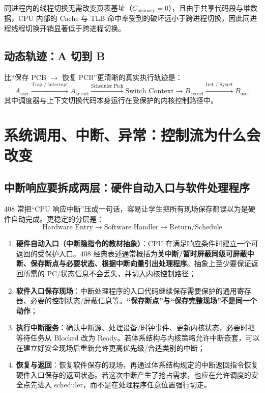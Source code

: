 \documentclass[11pt,a4paper]{ctexart}
\newcommand{\kw}[1]{\textbf{#1}}
\begin{document}
\begin{exam}[408 核心考点定性]
同进程内的线程切换无需改变页表基址（$C_{\text{memory}} = 0$），且由于共享代码段与堆数据，CPU 内部的 Cache 与 TLB 命中率受到的破坏远小于跨进程切换，因此同进程线程切换开销显著低于跨进程切换。
\end{exam}

\subsection{动态轨迹：A 切到 B}

比“保存 PCB $\to$ 恢复 PCB”更清晰的真实执行轨迹是：
\[
A_{\text{user}} \xrightarrow{\text{Trap / Interrupt}} A_{\text{kernel}} \xrightarrow{\text{Scheduler Pick}} \text{Switch Context} \xrightarrow{} B_{\text{kernel}} \xrightarrow{\text{Iret / Sysret}} B_{\text{user}}
\]
其中调度器与上下文切换代码本身运行在受保护的内核控制路径中。

\section{系统调用、中断、异常：控制流为什么会改变}

\subsection{中断响应要拆成两层：硬件自动入口与软件处理程序}

408 常把“CPU 响应中断”压成一句话，容易让学生把所有现场保存都误以为是硬件自动完成。更稳定的分层是：
\[
\boxed{\text{Hardware Entry}\rightarrow\text{Software Handler}\rightarrow\text{Return/Schedule}}
\]

\begin{enumerate}
\item \kw{硬件自动入口（中断隐指令的教材抽象）}：CPU 在满足响应条件时建立一个可返回的受保护入口。408 经典表述通常概括为\kw{关中断/暂时屏蔽同级可屏蔽中断、保存断点与必要状态、根据中断向量引出处理程序}。抽象上至少要保证返回所需的 PC/状态信息不会丢失，并切入内核控制路径；
\item \kw{软件入口保存现场}：中断处理程序的入口代码继续保存需要保护的通用寄存器、必要的控制状态/屏蔽信息等。\kw{“保存断点”与“保存完整现场”不是同一个动作}；
\item \kw{执行中断服务}：确认中断源、处理设备/时钟事件、更新内核状态，必要时把等待任务从 Blocked 改为 Ready。若体系结构与内核策略允许中断嵌套，可以在建立好安全现场后重新允许更高优先级/合适类别的中断；
\item \kw{恢复与返回}：恢复软件保存的现场，再通过体系结构规定的中断返回指令恢复硬件入口保存的返回状态。若这次中断产生了抢占需求，也应在允许调度的安全点先进入 scheduler，而不是在处理程序任意位置强行切走。
\end{enumerate}
\end{document}
